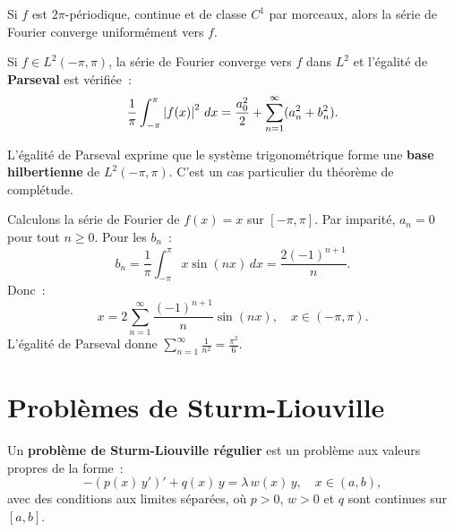 \begin{theoreme}
Si $f$ est $2\pi$-p\'eriodique, continue et de classe $C^1$ par morceaux,
alors la s\'erie de Fourier converge uniform\'ement vers $f$.
\end{theoreme}

\begin{theoreme}\label{thm:parseval}
Si $f \in L^2(-\pi, \pi)$, la s\'erie de Fourier converge vers $f$ dans
$L^2$ et l'\'egalit\'e de \textbf{Parseval} est v\'erifi\'ee~:
\begin{equation}\label{eq:parseval}
    \frac{1}{\pi}\int_{-\pi}^{\pi} \left| f(x) \right|^2\, dx
    = \frac{a_0^2}{2} + \sum_{n=1}^{\infty} (a_n^2 + b_n^2).
\end{equation}
\end{theoreme}

\begin{remarque}
L'\'egalit\'e de Parseval exprime que le syst\`eme trigonom\'etrique forme
une \textbf{base hilbertienne} de $L^2(-\pi,\pi)$. C'est un cas particulier
du th\'eor\`eme de compl\'etude.
\end{remarque}

\begin{exemple}
Calculons la s\'erie de Fourier de $f(x) = x$ sur $[-\pi, \pi]$.
Par imparit\'e, $a_n = 0$ pour tout $n \geq 0$. Pour les $b_n$~:
\[
    b_n = \frac{1}{\pi}\int_{-\pi}^{\pi} x \sin(nx)\, dx
    = \frac{2(-1)^{n+1}}{n}.
\]
Donc~:
\[
    x = 2\sum_{n=1}^{\infty} \frac{(-1)^{n+1}}{n}\sin(nx),
    \quad x \in (-\pi, \pi).
\]
L'\'egalit\'e de Parseval donne $\sum_{n=1}^{\infty} \frac{1}{n^2} = \frac{\pi^2}{6}$.
\end{exemple}

\section{Probl\`emes de Sturm-Liouville}

\begin{definition}
Un \textbf{probl\`eme de Sturm-Liouville r\'egulier} est un probl\`eme aux
valeurs propres de la forme~:
\begin{equation}\label{eq:sturm_liouville}
    -(p(x)\, y')' + q(x)\, y = \lambda\, w(x)\, y, \quad x \in (a,b),
\end{equation}
avec des conditions aux limites s\'epar\'ees, o\`u $p > 0$, $w > 0$ et $q$
sont continues sur $[a,b]$.
\end{definition}


